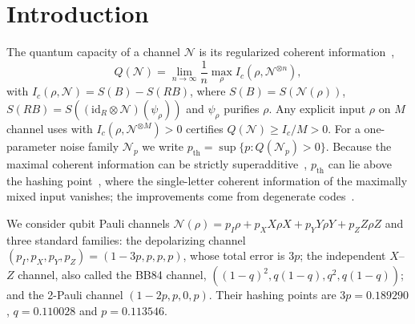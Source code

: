 \documentclass[aps,pra,reprint,superscriptaddress,nofootinbib,longbibliography,floatfix]{revtex4-2}
\theoremstyle{remark}
\newcommand{\id}{\mathrm{id}}
\newcommand{\Ic}{I_c}
\begin{document}
\maketitle

\section{Introduction}
\label{sec:intro}

The quantum capacity of a channel $\mathcal N$ is its regularized coherent
information~\cite{lloyd1997capacity,devetak2005private},
\begin{equation}
  Q(\mathcal N)=\lim_{n\to\infty}\frac1n\max_\rho \Ic(\rho,\mathcal N^{\otimes n}),
  \label{eq:Q}
\end{equation}
with $\Ic(\rho,\mathcal N)=S(B)-S(RB)$,
where $S(B)=S(\mathcal N(\rho))$, $S(RB)=S((\id_R\otimes\mathcal N)(\psi_\rho))$ and $\psi_\rho$ purifies
$\rho$. Any explicit input $\rho$ on $M$ channel uses with $\Ic(\rho,\mathcal N^{\otimes M})>0$
certifies $Q(\mathcal N)\ge \Ic/M>0$. For a one-parameter noise family $\mathcal N_p$ we write
$p_{\mathrm{th}}=\sup\{p:Q(\mathcal N_p)>0\}$. Because the maximal coherent information can be
strictly superadditive~\cite{divincenzo1998verynoisy}, $p_{\mathrm{th}}$ can lie above the hashing
point~\cite{bennett1996mixed}, where the single-letter coherent information of the maximally mixed
input vanishes; the improvements come from degenerate
codes~\cite{divincenzo1998verynoisy,smith2007degenerate,fern2008lower,bausch2021pauli}.

We consider qubit Pauli channels
$\mathcal N(\rho)=p_I\rho+p_XX\rho X+p_YY\rho Y+p_ZZ\rho Z$ and three standard families:
the depolarizing channel $(p_I,p_X,p_Y,p_Z)=(1-3p,p,p,p)$, whose total error is $3p$; the
independent $X$--$Z$ channel, also called the BB84 channel, $((1-q)^2,q(1-q),q^2,q(1-q))$; and the
2-Pauli channel $(1-2p,p,0,p)$. Their hashing points are $3p=0.189290$, $q=0.110028$ and $p=0.113546$.
\end{document}
